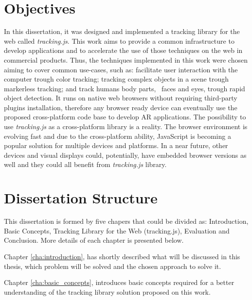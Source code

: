 
\section{Objectives} %
\label{sec:introduction:objectives}

In this dissertation, it was designed and implemented a tracking library for the web called \textit{tracking.js}. This work aims to provide a common infrastructure to develop applications and to accelerate the use of those techniques on the web in commercial products. Thus, the techniques implemented in this work were chosen aiming to cover common use-cases, such as: facilitate user interaction with the computer trough color tracking; tracking complex objects in a scene trough markerless tracking; and track humans body parts, \eg\ faces and eyes, trough rapid object detection. It runs on native web browsers without requiring third-party plugins installation, therefore any browser ready device can eventually use the proposed cross-platform code base to develop AR applications. The possibility to use \textit{tracking.js} as a cross-platform library is a reality. The browser environment is evolving fast and due to the cross-platform ability, JavaScript \cite{International2009} is becoming a popular solution for multiple devices and platforms. In a near future, other devices and visual displays could, potentially, have embedded browser versions as well and they could all benefit from \textit{tracking.js} library.


\section{Dissertation Structure} %
\label{sec:introduction:dissertation_structure}

This dissertation is formed by five chapers that could be divided as: Introduction, Basic Concepts, Tracking Library for the Web (tracking.js), Evaluation and Conclusion. More details of each chapter is presented below.

Chapter \ref{cha:introduction}, has shortly described what will be discussed in this thesis, which problem will be solved and the chosen approach to solve it.

Chapter \ref{cha:basic_concepts}, introduces basic concepts required for a better understanding of the tracking library solution proposed on this work.

